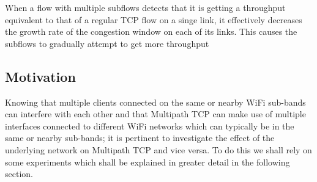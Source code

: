 When a flow with
multiple subflows detects that it is getting a throughput equivalent to that of
a regular TCP flow on a singe link, it effectively decreases the growth rate of
the congestion window on each of its links. This causes the subflows to
gradually attempt to get more throughput 

\subsection{Motivation}
Knowing that multiple clients connected on the same or nearby WiFi sub-bands 
can interfere with each other and that Multipath TCP can make use of multiple 
interfaces connected to different WiFi networks which can typically be in the 
same or nearby sub-bands; it is pertinent to investigate the effect of the 
underlying network on Multipath TCP and vice versa. To do this we shall rely on 
some experiments which shall be explained in greater detail in the following 
section.



